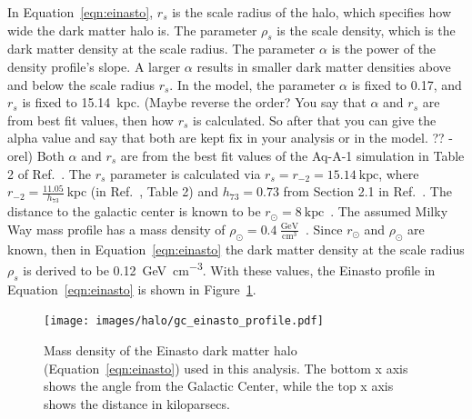    
    In Equation~\ref{eqn:einasto}, $r_s$ is the scale radius of the halo, which specifies how wide the dark matter halo is.
    The parameter $\rho_s$ is the scale density, which is the dark matter density at the scale radius.
    The parameter $\alpha$ is the power of the density profile's slope.
    A larger $\alpha$ results in smaller dark matter densities above and below the scale radius $r_s$.
    In the model, the parameter $\alpha$ is fixed to 0.17, and $r_s$ is fixed to \SI{15.14}{kpc}.
    {\color{red}(Maybe reverse the order? You say that $\alpha$ and $r_s$ are from best fit values, then how $r_s$ is calculated. So after that you can give the alpha value and say that both are kept fix in your analysis or in the model. ?? -orel)}
    Both $\alpha$ and $r_s$ are from the best fit values of the Aq-A-1 simulation in Table 2 of Ref.~\cite{mw_halo_params}.
    The $r_s$ parameter is calculated via $r_s=r_{-2}=15.14\:\textrm{kpc}$, where $r_{-2}=\frac{11.05}{h_{73}}\:\textrm{kpc}$ (in Ref.~\cite{mw_halo_params}, Table 2) and $h_{73}=0.73$ from Section 2.1 in Ref.~\cite{mw_halo_params}.
    The distance to the galactic center is known to be $r_\odot=8\:\textrm{kpc}$~\cite{gc_distance_1,gc_distance_2,gc_distance_3}.
    The assumed Milky Way mass profile has a mass density of $\rho_\odot = 0.4\:\frac{\textrm{GeV}}{\textrm{cm}^3}$~\cite{local_dm_density,direct_dm_astrophysical_uncertainties}.
    Since $r_\odot$ and $\rho_\odot$ are known, then in Equation~\ref{eqn:einasto} the dark matter density at the scale radius $\rho_s$ is derived to be \SI{0.12}{\GeV\per\cm^3}.
    With these values, the Einasto profile in Equation~\ref{eqn:einasto} is shown in Figure~\ref{fig:gchalo_density}.
  
    \begin{figure}[ht]
      \centering
      \texttt{[image: images/halo/gc\_einasto\_profile.pdf]}
      \caption[Galactic Center Einasto Halo Density]{
        Mass density of the Einasto dark matter halo (Equation~\ref{eqn:einasto}) used in this analysis.
        The bottom x axis shows the angle from the Galactic Center, while the top x axis shows the distance in kiloparsecs.
        \CaptionBlankLine
        }
      \label{fig:gchalo_density}
    \end{figure}

